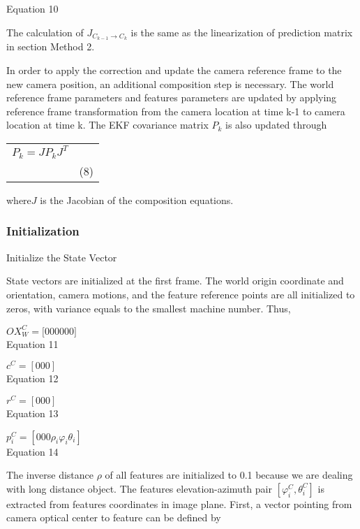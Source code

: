 Equation 10

The calculation of $J_{C_{k-1}\to C_{k}}$ is the same as the 
linearization of prediction matrix in section Method 2.

In order to apply the correction and update the camera reference frame 
to the new camera position, an additional composition step is necessary. 
The world reference frame parameters and features parameters are updated 
by applying reference frame transformation from the camera location at 
time k-1 to camera location at time k. The EKF covariance matrix $P_{k}
$ is also updated through

\begin{table}[h]
\centering
\begin{tabular}{|l|l|}
\hline
$P_{k}=JP_{k}J^{T}$\\
 & (8) \\
\hline
\end{tabular}
\end{table}
where$J$ is the Jacobian of the composition equations. 

\subsubsection{Initialization}\label{section:_Toc332876137}
Initialize the State Vector

State vectors are initialized at the first frame. The world origin 
coordinate and orientation, camera motions, and the feature reference 
points are all initialized to zeros, with variance equals to the 
smallest machine number. Thus, 

$OX_{W}^{C}=\lbrack 0 0 0 0 0 0\rbrack $\\


Equation 11

$c^{C}=[0 0 0]$\\


Equation 12

$r^{C}=[0 0 0]$\\


Equation 13

$p_{i}^{C}=[0 0 0 \rho _{i}\varphi _{i}\theta _{i} ]$\\


Equation 14

The inverse distance $\rho $ of all features are initialized to 0.1 
because we are dealing with long distance object. The features 
elevation-azimuth pair $[\varphi _{i}^{C}, \theta _{i}^{C}]$ is 
extracted from features coordinates in image plane. First, a vector 
pointing from camera optical center to feature can be defined by

